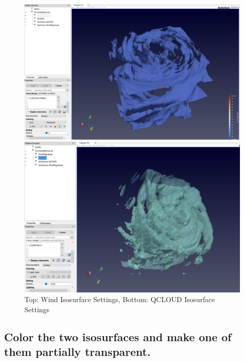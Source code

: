 \documentclass[a4paper,11pt]{article}
\theoremstyle{mytheor}
\begin{document}
\begin{figure}[!h]
    \centering
    \includegraphics[scale=0.45]{Figures/P1_1_1.PNG}
    
    \vspace{1 cm}
    \includegraphics[scale=0.5]{Figures/P1_2_1.PNG}
    \caption{Top: Wind Isosurface Settings, Bottom: QCLOUD Isosurface Settings}
    \label{p1_6}
\end{figure}

\clearpage

\subsection{Color the two isosurfaces and make one of them partially transparent.}
\end{document}
